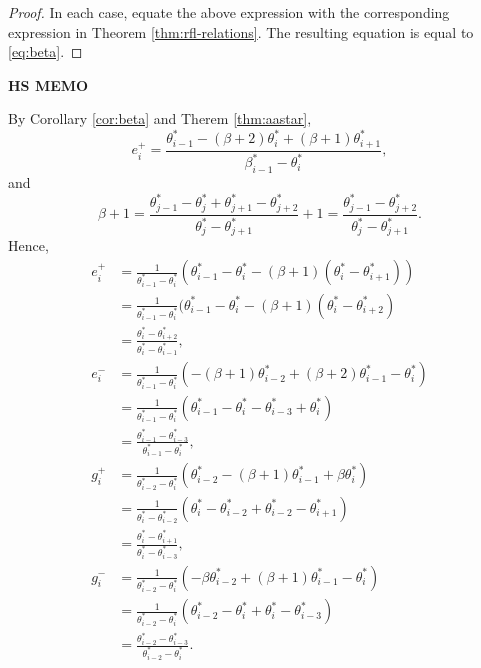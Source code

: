 \documentclass[
]{book}
\theoremstyle{definition}
\theoremstyle{definition}
\theoremstyle{definition}
\theoremstyle{definition}
\theoremstyle{remark}
\begin{document}
\begin{proof}
In each case, equate the above expression with the corresponding expression in Theorem \ref{thm:rfl-relations}.
The resulting equation is equal to \eqref{eq:beta}.
\end{proof}

\textbf{HS MEMO}

By Corollary \ref{cor:beta} and Therem \ref{thm:aastar},
\[e^+_i = \frac{\theta^*_{i-1}-(\beta+2)\theta^*_i + (\beta+1)\theta^*_{i+1}}{\beta^*_{i-1}-\theta^*_i},\]
and
\[\beta + 1 = \frac{\theta^*_{j-1}-\theta^*_j+\theta^*_{j+1}-\theta^*_{j+2}}{\theta^*_j-\theta^*_{j+1}}+1 = \frac{\theta^*_{j-1}-\theta^*_{j+2}}{\theta^*_j-\theta^*_{j+1}}.\]
Hence,
\begin{align}
e^+_i & = \frac{1}{\theta^*_{i-1}-\theta^*_i}(\theta^*_{i-1}-\theta^*_i-(\beta+1)(\theta^*_i-\theta^*_{i+1}))\\
& = \frac{1}{\theta^*_{i-1}-\theta^*_i}(\theta^*_{i-1}-\theta^*_i - (\beta+1)(\theta^*_i-\theta^*_{i+2})\\
& = \frac{\theta^*_i-\theta^*_{i+2}}{\theta^*_{i}-\theta^*_{i-1}},\\
e^-_i & = \frac{1}{\theta^*_{i-1}-\theta^*_i}(-(\beta+1)\theta^*_{i-2}+(\beta+2)\theta^*_{i-1}-\theta^*_i)\\
& = \frac{1}{\theta^*_{i-1}-\theta^*_i}(\theta^*_{i-1}-\theta^*_i - \theta^*_{i-3}+\theta^*_{i})\\
& = \frac{\theta^*_{i-1}-\theta^*_{i-3}}{\theta^*_{i-1}-\theta^*_{i}},\\
g^+_i & = \frac{1}{\theta^*_{i-2}-\theta^*_i}(\theta^*_{i-2}-(\beta+1)\theta^*_{i-1}+\beta\theta^*_{i})\\
& = \frac{1}{\theta^*_{i}-\theta^*_{i-2}}(\theta^*_{i}-\theta^*_{i-2} + \theta^*_{i-2}-\theta^*_{i+1})\\
& = \frac{\theta^*_i-\theta^*_{i+1}}{\theta^*_{i}-\theta^*_{i-3}},\\
g^-_i & = \frac{1}{\theta^*_{i-2}-\theta^*_i}(-\beta\theta^*_{i-2}+(\beta+1)\theta^*_{i-1}-\theta^*_i)\\
& = \frac{1}{\theta^*_{i-2}-\theta^*_i}(\theta^*_{i-2}-\theta^*_i + \theta^*_{i}-\theta^*_{i-3})\\
& = \frac{\theta^*_{i-2}-\theta^*_{i-3}}{\theta^*_{i-2}-\theta^*_{i}}.
\end{align}
\end{document}
